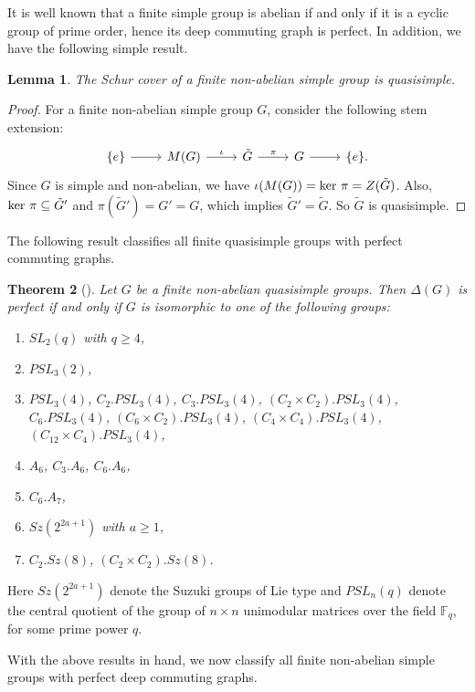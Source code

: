 \documentclass[12pt,a4paper]{article}
\newtheorem{theorem}{Theorem}[section]
\newtheorem{lemma}[theorem]{Lemma}
\begin{document}
It is well known that a finite simple group is abelian if and only if it is a cyclic group of prime order, hence its deep commuting graph is perfect. In addition, we have the following simple result.
\begin{lemma}\label{Schur cover quasisimple}
The Schur cover of a finite non-abelian simple group is quasisimple.  
\end{lemma}
\begin{proof}
For a finite non-abelian simple group $G$, consider the following stem extension: 
\[
\begin{tikzcd}
  \{e\} \arrow[r] & M(G) \arrow[r, "\iota"] & \tilde{G} \arrow[r, "\pi"] & G \arrow[r] & \{e\}. 
\end{tikzcd}
\]
Since $G$ is simple and non-abelian, we have $\iota(M(G))={\rm ker }~\pi=Z(\tilde{G})$. Also, ${\rm ker}~\pi\subseteq \tilde{G}'$ and $\pi(\tilde{G}')=G'=G$, which implies $\tilde{G}'=\tilde{G}$. So $\tilde{G}$ is quasisimple.    
\end{proof}
\noindent The following result classifies all finite quasisimple groups with perfect commuting graphs.
\begin{theorem}[{\rm\cite[Theorem 1]{britnell}}]\label{perfect commuting graph}
Let $G$ be a finite non-abelian quasisimple groups. Then $\Delta(G)$ is perfect if and only if $G$ is isomorphic to one of the following groups: 
\begin{enumerate}[\rm 1)]
    \item $SL_2(q)$ with $q\geq 4$,
    \item $PSL_3(2)$,
    \item $PSL_3(4)$, $C_2.PSL_3(4)$, $C_3.PSL_3(4)$, $(C_2\times C_2).PSL_3(4)$, $C_6.PSL_3(4)$, $(C_6\times C_2).PSL_3(4)$, $(C_4\times C_4).PSL_3(4)$, $(C_{12}\times C_4).PSL_3(4)$,
    \item $A_6$, $C_3.A_6$, $C_6.A_6$,
    \item $C_6.A_7$,
    \item $Sz(2^{2a+1})$ with $a\geq 1$,
    \item $C_2.Sz(8)$, $(C_2\times C_2).Sz(8)$.
\end{enumerate}
\end{theorem}
\noindent Here $Sz(2^{2a+1})$ denote the Suzuki groups of Lie type and $PSL_{n}(q)$ denote the central quotient of the group of $n\times n$ unimodular matrices over the field $\mathbb{F}_q$, for some prime power $q$.

With the above results in hand, we now classify all finite non-abelian simple groups with perfect deep commuting graphs.
\end{document}
